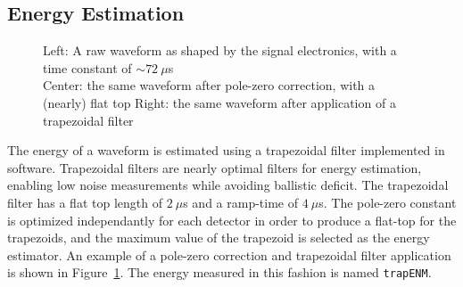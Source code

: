 \documentclass[/main.tex]{subfiles}
\begin{document}
\subsection{Energy Estimation}
\begin{figure}
  \centering
  \caption[Pole-zero correction and trapezoidal filter]{\label{fig:trapfilter}
    Left: A raw waveform as shaped by the signal electronics, with a time constant of ${\sim}72~\mu$s\\
    Center: the same waveform after pole-zero correction, with a (nearly) flat top
    Right: the same waveform after application of a trapezoidal filter
  }
\end{figure}
The energy of a waveform is estimated using a trapezoidal filter implemented in software.
Trapezoidal filters are nearly optimal filters for energy estimation, enabling low noise measurements while avoiding ballistic deficit\cite{Radeka1972, knoll}.
The trapezoidal filter has a flat top length of $2~\mu$s and a ramp-time of $4~\mu$s.
The pole-zero constant is optimized independantly for each detector in order to produce a flat-top for the trapezoids, and the maximum value of the trapezoid is selected as the energy estimator.
An example of a pole-zero correction and trapezoidal filter application is shown in Figure~\ref{fig:trapfilter}.
The energy measured in this fashion is named \texttt{trapENM}.
\end{document}
